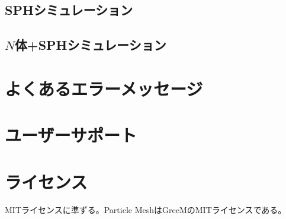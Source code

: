 \documentclass[12pt,a4paper]{jarticle}
\begin{document}
\subsection{SPHシミュレーション}

\subsection{$N$体+SPHシミュレーション}

\newpage

\section{よくあるエラーメッセージ}

\newpage

\section{ユーザーサポート}

\newpage

\section{ライセンス}

MITライセンスに準ずる。Particle MeshはGreeMのMITライセンスである。
\end{document}
